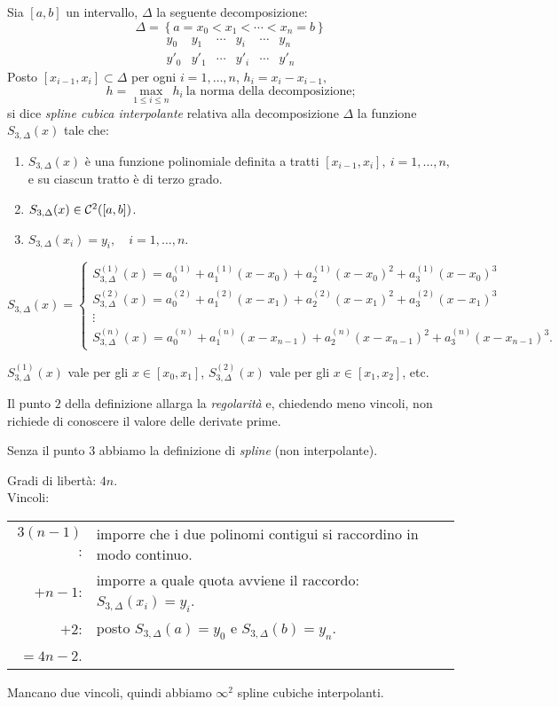 \begin{defi}
Sia $[a,b]$ un intervallo, $\Delta$ la seguente decomposizione:
\[\Delta = \left\{a = x_0 < x_1 < \cdots < x_n = b\right\}\]
\[\begin{array}{ccccccc}
y_0 & y_1 & \cdots &y_i &\cdots & y_n  \\
y'_0 & y'_1 & \cdots &y'_i &\cdots & y'_n  
\end{array}\]
Posto $[x_{i-1}, x_i] \subset \Delta$ per ogni $i = 1, \ldots, n$, $h_i =
x_i - x_{i-1},$
\[h = \max_{1 \leq i \leq n} h_i \ \textrm{la norma della decomposizione;}\]
si dice \emph{spline cubica interpolante} relativa alla decomposizione
$\Delta$ la funzione $S_{3,\Delta}(x)$ tale che:
\begin{enumerate}
\item $S_{3,\Delta}(x)$ è una funzione polinomiale definita a tratti
$[x_{i-1}, x_i], \ i = 1, \ldots, n,$ e su ciascun tratto è di terzo grado.
\item $S_{3,\Delta}(x) \in \mathcal{C}^2([a,b])$.
\item $S_{3,\Delta}(x_i) = y_i, \quad i = 1, \ldots, n$.
\end{enumerate}
\end{defi}

\[
S_{3,\Delta}(x) = \left \{
\begin{array}{l}
S_{3,\Delta}^{(1)}(x) =  a_0^{(1)} + a_1^{(1)}(x-x_0) +a_2^{(1)}(x-x_0)^2
+ a_3^{(1)}(x-x_0)^3  \\
S_{3,\Delta}^{(2)}(x) =  a_0^{(2)} + a_1^{(2)}(x-x_1) +a_2^{(2)}(x-x_1)^2
+ a_3^{(2)}(x-x_1)^3 \\
\vdots \\
S_{3,\Delta}^{(n)}(x) =  a_0^{(n)} + a_1^{(n)}(x-x_{n-1}) +a_2^{(n)}(x-x_{n-1})^2
+ a_3^{(n)}(x-x_{n-1})^3.
\end{array}\right.
\]
\begin{notabene}
$S_{3,\Delta}^{(1)}(x)$ vale per gli $x \in [x_0, x_1]$, 
$S_{3,\Delta}^{(2)}(x)$  vale per gli $x \in [x_1, x_2]$, etc.
\end{notabene}

Il punto $2$ della definizione allarga la \emph{regolarità} e, chiedendo meno
vincoli, non richiede di conoscere il valore delle derivate prime.

Senza il punto $3$ abbiamo la definizione di \emph{spline} (non interpolante).

\begin{flushleft}
Gradi di libertà: $4n$.\\
Vincoli:\\
\begin{tabular}{rl}
$3(n-1)$: & imporre che i due polinomi contigui si raccordino in modo
continuo.\\
$+ n-1$: 
& imporre a quale quota avviene il raccordo: $S_{3,\Delta}(x_i) = y_i$.\\
$+ 2$: & posto $S_{3,\Delta}(a) = y_0$ e $S_{3,\Delta}(b) = y_n$. \\
$= 4n -2$.
\end{tabular}

Mancano due vincoli, quindi abbiamo $\infty^2$ spline cubiche interpolanti.
\end{flushleft}

